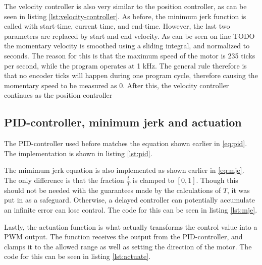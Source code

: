 \documentclass[11pt]{article}
\begin{document}


The velocity controller is also very similar to the position controller, as can be seen in listing \vref{lst:velocity-controller}. As before, the minimum jerk function is called with start-time, current time, and end-time. However, the last two parameters are replaced by  start and end velocity. As can be seen on line TODO the momentary velocity is smoothed using a sliding integral, and normalized to seconds. The reason for this is that the maximum speed of the motor is 235 ticks per second, while the program operates at 1 kHz. The general rule therefore is that no encoder ticks will happen during one program cycle, therefore causing the momentary speed to be measured as 0. After this, the velocity controller continues as the position controller



\subsection{PID-controller, minimum jerk and actuation}
The PID-controller used before matches the equation shown earlier in \vref{eq:pid}. The implementation is shown in listing \vref{lst:pid}.



The mimimum jerk equation is also implemented as shown earlier  in \vref{eq:mje}. The only difference is that the fraction $\frac{t}{T}$ is clamped to $[0,1]$. Though this should not be needed with the guarantees made by the calculations of $T$, it was put in as a safeguard. Otherwise, a delayed controller can potentially accumulate an infinite error can lose control. The code for this can be seen in listing \vref{lst:mje}.\par



Lastly, the actuation function is what actually transforms the control value into a PWM output. The function receives the output from the PID-controller, and clamps it to the allowed range as well as setting the direction of the motor. The code for this can be seen in listing \vref{lst:actuate}.
\end{document}
